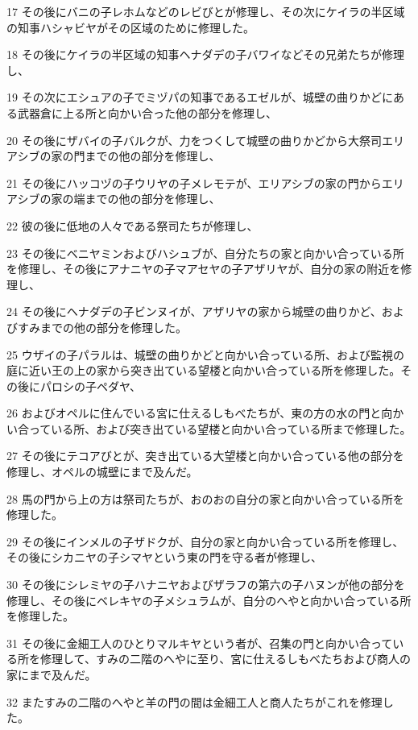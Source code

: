 \par 17 その後にバニの子レホムなどのレビびとが修理し、その次にケイラの半区域の知事ハシャビヤがその区域のために修理した。
\par 18 その後にケイラの半区域の知事ヘナダデの子バワイなどその兄弟たちが修理し、
\par 19 その次にエシュアの子でミヅパの知事であるエゼルが、城壁の曲りかどにある武器倉に上る所と向かい合った他の部分を修理し、
\par 20 その後にザバイの子バルクが、力をつくして城壁の曲りかどから大祭司エリアシブの家の門までの他の部分を修理し、
\par 21 その後にハッコヅの子ウリヤの子メレモテが、エリアシブの家の門からエリアシブの家の端までの他の部分を修理し、
\par 22 彼の後に低地の人々である祭司たちが修理し、
\par 23 その後にベニヤミンおよびハシュブが、自分たちの家と向かい合っている所を修理し、その後にアナニヤの子マアセヤの子アザリヤが、自分の家の附近を修理し、
\par 24 その後にヘナダデの子ビンヌイが、アザリヤの家から城壁の曲りかど、およびすみまでの他の部分を修理した。
\par 25 ウザイの子パラルは、城壁の曲りかどと向かい合っている所、および監視の庭に近い王の上の家から突き出ている望楼と向かい合っている所を修理した。その後にパロシの子ペダヤ、
\par 26 およびオペルに住んでいる宮に仕えるしもべたちが、東の方の水の門と向かい合っている所、および突き出ている望楼と向かい合っている所まで修理した。
\par 27 その後にテコアびとが、突き出ている大望楼と向かい合っている他の部分を修理し、オペルの城壁にまで及んだ。
\par 28 馬の門から上の方は祭司たちが、おのおの自分の家と向かい合っている所を修理した。
\par 29 その後にインメルの子ザドクが、自分の家と向かい合っている所を修理し、その後にシカニヤの子シマヤという東の門を守る者が修理し、
\par 30 その後にシレミヤの子ハナニヤおよびザラフの第六の子ハヌンが他の部分を修理し、その後にベレキヤの子メシュラムが、自分のへやと向かい合っている所を修理した。
\par 31 その後に金細工人のひとりマルキヤという者が、召集の門と向かい合っている所を修理して、すみの二階のへやに至り、宮に仕えるしもべたちおよび商人の家にまで及んだ。
\par 32 またすみの二階のへやと羊の門の間は金細工人と商人たちがこれを修理した。


